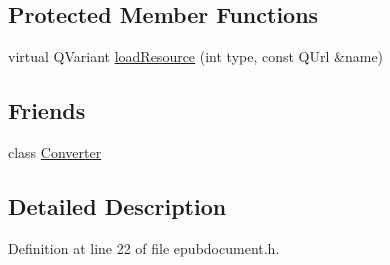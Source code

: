 \subsection*{Protected Member Functions}
\begin{DoxyCompactItemize}
\item 
virtual Q\+Variant \hyperlink{classEpub_1_1EpubDocument_a5977d43df31dc940280f6fc80eb6bc75}{load\+Resource} (int type, const Q\+Url \&name)
\end{DoxyCompactItemize}
\subsection*{Friends}
\begin{DoxyCompactItemize}
\item 
class \hyperlink{classEpub_1_1EpubDocument_aa98b6fcd5fef1695696973c9f993323d}{Converter}
\end{DoxyCompactItemize}


\subsection{Detailed Description}


Definition at line 22 of file epubdocument.\+h.



